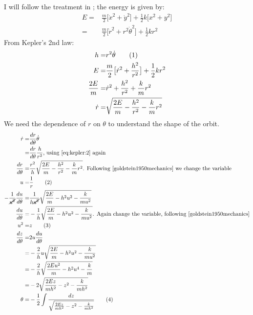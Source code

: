 \documentclass[]{article}
\newcommand\numberthis{\addtocounter{equation}{1}\tag{\theequation}}
\begin{document}
I will follow the treatment in \cite{baez2005Kepler}; the energy is given by:
\begin{align*}
	E =& \frac{m}{2}\big[\dot{x}^2 + \dot{y}^2 \big] + \frac{1}{2}k\big[x^2 + y^2\big]\\
	=& \frac{m}{2}\big[\dot{r}^2 + r^2\dot{\theta}^2 \big] + \frac{1}{2}k r^2 
\end{align*}
From Kepler's 2nd law:
\begin{align*}
	h =& r^2\dot{\theta} \numberthis \label{eq:kepler:2}\\
	E =& \frac{m}{2}\big[\dot{r}^2 + \frac{h^2}{r^2} \big] + \frac{1}{2}k r^2\\
	\frac{2E}{m} =& \dot{r}^2 + \frac{h^2}{r^2} + \frac{k}{m} r^2\\
	\dot{r} =& \sqrt{\frac{2E}{m}-\frac{h^2}{r^2} - \frac{k}{m} r^2}
\end{align*}
We need the dependence of $r$ on $\theta$ to understand the shape of the orbit.
\begin{align*}
	\dot{r} =& \frac{dr}{d\theta} \dot{\theta} \\
	=& \frac{dr}{d\theta} \frac{h}{r^2}\text{, using \eqref{eq:kepler:2} again}\\
	\frac{dr}{d\theta} =& \frac{r^2}{h} \sqrt{\frac{2E}{m}-\frac{h^2}{r^2} - \frac{k}{m} r^2} \text{. Following \cite{goldstein1950mechanics} we change the variable}\\
	u =& \frac{1}{r} \numberthis \label{eq:introduce:u}\\
	-\frac{1}{\cancel{u^2}} \frac{du}{d\theta} =& \frac{1}{h \cancel{u^2}} \sqrt{\frac{2E}{m}- h^2 u^2 - \frac{k}{m u^2} } \\
	 \frac{du}{d\theta} =& -\frac{1}{h} \sqrt{\frac{2E}{m}- h^2 u^2 - \frac{k}{m u^2} } \text{. Again change the variable, following \cite{goldstein1950mechanics}}\\
	 u^2 =& z \numberthis \label{eq:introduce:z}\\
	 \frac{dz}{d\theta} =& 2u \frac{du}{d\theta}\\
	 =& -\frac{2}{h} u \sqrt{\frac{2E}{m}- h^2 u^2 - \frac{k}{m u^2}}\\
	 =& -\frac{2}{h}  \sqrt{\frac{2Eu^2}{m}- h^2 u^4 - \frac{k}{m} }\\
	 =& -2  \sqrt{\frac{2E z}{mh^2}-  z^2 - \frac{k}{mh^2} }\\
	\theta =& -\frac{1}{2}\int \frac{dz}{\sqrt{\frac{2E z}{mh^2}- z^2 - \frac{k}{mh^2} }}  \numberthis \label{eq:theta}
\end{align*}
\end{document}
